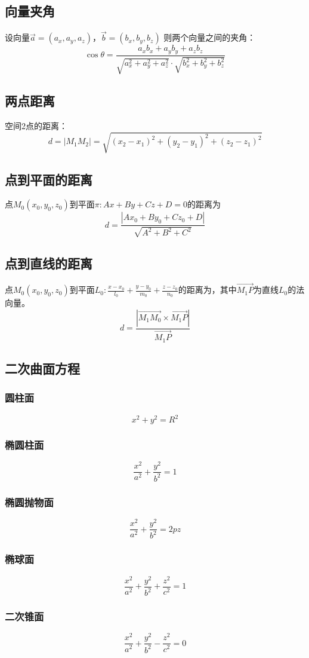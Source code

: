 \documentclass[a4paper,zihao=-4,UTF8]{ctexbook}
\begin{document}
\subsection{向量夹角}
设向量$\vec{a}=(a_x,a_y,a_z)$，$\vec{b}=(b_x,b_y,b_z)$
则两个向量之间的夹角：
\[\cos \theta=\frac{a_xb_x+a_yb_y+a_zb_z}{\sqrt{a_x^2+a_y^2+a_z^2}\cdot\sqrt{b_x^2+b_y^2+b_z^2}}\]
\subsection{两点距离}
空间2点的距离：
\[d=|M_1M_2|=\sqrt{(x_2-x_1)^2+(y_2-y_1)^2+(z_2-z_1)^2}\]
\subsection{点到平面的距离}
点$M_0(x_0,y_0,z_0)$到平面$\pi:Ax+By+Cz+D=0$的距离为
\[d=\frac{|Ax_0+By_0+Cz_0+D|}{\sqrt{A^2+B^2+C^2}}\]
\subsection{点到直线的距离}
点$M_0(x_0,y_0,z_0)$到平面$L_0:\frac{x-x_0}{l_0}+\frac{y-y_0}{m_0}+\frac{z-z_0}{n_0}$的距离为，其中$\overrightarrow{M_1P}$为直线$L_0$的法向量。
\[d=\frac{|\overrightarrow{M_1M_0}\times\overrightarrow{M_1P}|}{\overrightarrow{M_1P}}\]
\subsection{二次曲面方程}
\subsubsection{圆柱面}
\[x^2+y^2=R^2\]
\subsubsection{椭圆柱面}
\[\frac{x^2}{a^2}+\frac{y^2}{b^2}=1\]
\subsubsection{椭圆抛物面}
\[\frac{x^2}{a^2}+\frac{y^2}{b^2}=2pz\]
\subsubsection{椭球面}
\[\frac{x^2}{a^2}+\frac{y^2}{b^2}+\frac{z^2}{c^2}=1\]
\subsubsection{二次锥面}
\[\frac{x^2}{a^2}+\frac{y^2}{b^2}-\frac{z^2}{c^2}=0\]
\end{document}
